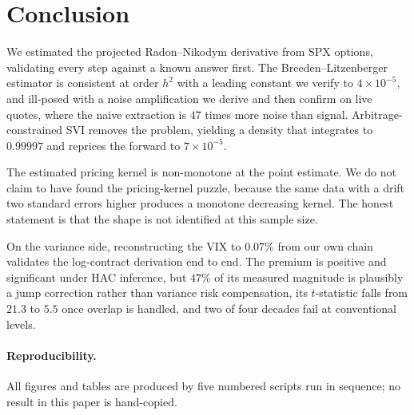 \documentclass[11pt,a4paper]{article}
\theoremstyle{remark}
\begin{document}
\section{Conclusion}
\label{sec:conclusion}

We estimated the projected Radon--Nikodym derivative from SPX options,
validating every step against a known answer first. The Breeden--Litzenberger
estimator is consistent at order $h^2$ with a leading constant we verify to
$4\times10^{-5}$, and ill-posed with a noise amplification we derive and then
confirm on live quotes, where the naive extraction is $47$ times more noise than
signal. Arbitrage-constrained SVI removes the problem, yielding a density that
integrates to $0.99997$ and reprices the forward to $7\times10^{-5}$.

The estimated pricing kernel is non-monotone at the point estimate. We do not
claim to have found the pricing-kernel puzzle, because the same data with a
drift two standard errors higher produces a monotone decreasing kernel. The
honest statement is that the shape is not identified at this sample size.

On the variance side, reconstructing the VIX to $0.07\%$ from our own chain
validates the log-contract derivation end to end. The premium is positive and
significant under HAC inference, but $47\%$ of its measured magnitude is
plausibly a jump correction rather than variance risk compensation, its
$t$-statistic falls from $21.3$ to $5.5$ once overlap is handled, and two of
four decades fail at conventional levels.

\paragraph{Reproducibility.} All figures and tables are produced by five
numbered scripts run in sequence; no result in this paper is hand-copied.
\end{document}
